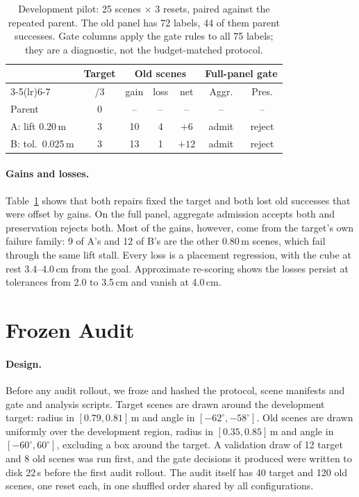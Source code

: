 \documentclass[letterpaper]{article} %
\begin{document}
\begin{table}[t]
\centering
\small
\setlength{\tabcolsep}{3.2pt}
\begin{tabular}{lcccccc}
\toprule
 & Target & \multicolumn{3}{c}{Old scenes} & \multicolumn{2}{c}{Full-panel gate} \\
\cmidrule(lr){3-5}\cmidrule(lr){6-7}
 & /3 & gain & loss & net & Aggr. & Pres. \\
\midrule
Parent & 0 & -- & -- & -- & -- & -- \\
A: lift 0.20\,m & 3 & 10 & 4 & $+6$ & admit & reject \\
B: tol.\ 0.025\,m & 3 & 13 & 1 & $+12$ & admit & reject \\
\bottomrule
\end{tabular}
\caption{Development pilot: 25 scenes $\times$ 3 resets, paired against the repeated parent. The old panel has 72 labels, 44 of them parent successes. Gate columns apply the gate rules to all 75 labels; they are a diagnostic, not the budget-matched protocol.}
\label{tab:pilot}
\end{table}

\paragraph{Gains and losses.} Table~\ref{tab:pilot} shows that both repairs fixed the target and both lost old successes that were offset by gains. On the full panel, aggregate admission accepts both and preservation rejects both. Most of the gains, however, come from the target's own failure family: 9 of A's and 12 of B's are the other 0.80\,m scenes, which fail through the same lift stall. Every loss is a placement regression, with the cube at rest 3.4--4.0\,cm from the goal. Approximate re-scoring shows the losses persist at tolerances from 2.0 to 3.5\,cm and vanish at 4.0\,cm.

\section{Frozen Audit}
\paragraph{Design.} Before any audit rollout, we froze and hashed the protocol, scene manifests and gate and analysis scripts. Target scenes are drawn around the development target: radius in $[0.79, 0.81]$\,m and angle in $[-62^\circ, -58^\circ]$. Old scenes are drawn uniformly over the development region, radius in $[0.35, 0.85]$\,m and angle in $[-60^\circ, 60^\circ]$, excluding a box around the target. A validation draw of 12 target and 8 old scenes was run first, and the gate decisions it produced were written to disk 22\,s before the first audit rollout. The audit itself has 40 target and 120 old scenes, one reset each, in one shuffled order shared by all configurations.
\end{document}
